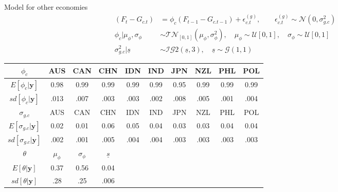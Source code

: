 \documentclass[notes,blackandwhite,mathsans,usenames,dvipsnames]{beamer}
\begin{document}
\begin{frame}{Model for other economies}
\small
\begin{align*}
(F_t - G_{c.t}) &= \phi_c(F_{t-1}- G_{c.t-1}) + \epsilon_{c.t}^{(g)},\qquad
\epsilon_{c.t}^{(g)} \sim\mathcal{N}\left( 0,\sigma_{g.c}^2 \right)\\[1ex]
\phi_c|\mu_\phi, \sigma_\phi &\sim\mathcal{TN}_{[0,1]}\left(\mu_\phi, \sigma_\phi^2\right),\quad
\mu_\phi \sim\mathcal{U}[0,1], \quad
\sigma_\phi \sim \mathcal{U}[0,1]\\
\sigma_{g.c}^2|\underline{s} &\sim\mathcal{IG}2\left(\underline{s},3\right),\quad
\underline{s} \sim\mathcal{G}\left( 1,1 \right)
\end{align*}

\begin{adjustwidth}{-0.1cm}{0cm}
\footnotesize
\bigskip\begin{center}
\begin{tabular}{cccccccccc}
\toprule
$\phi_c$ &AUS&CAN&CHN&IDN&IND&JPN&NZL&PHL&POL\\
\midrule
$E[\phi_c|\mathbf{y}]$&0.98& 0.99& 0.99& 0.99& 0.99& 0.95& 0.99& 0.99& 0.99\\
$sd[\phi_c|\mathbf{y}]$&.013& .007& .003& .003& .002& .008& .005& .001& .004\\[1ex]
\midrule
$\sigma_{g.c}$ &AUS&CAN&CHN&IDN&IND&JPN&NZL&PHL&POL\\
\midrule
$E[\sigma_{g.c}|\mathbf{y}]$&0.02& 0.01& 0.06& 0.05& 0.04& 0.03& 0.03& 0.04& 0.04\\
$sd[\sigma_{g.c}|\mathbf{y}]$&.002& .001&.005&.004&.004&.003&.003&.003&.003\\[1ex]
\midrule
$\theta$ & $\mu_\phi$ & $\sigma_\phi$ & $\underline{s}$ &&&&&& \\
\midrule
$E[\theta|\mathbf{y}]$ & 0.37 & 0.56&  0.04 &&&&&&\\
$sd[\theta|\mathbf{y}]$ & .28&  .25&  .006 &&&&&&\\
\bottomrule
\end{tabular}
\end{center}
\end{adjustwidth}
\end{frame}


\end{document}
